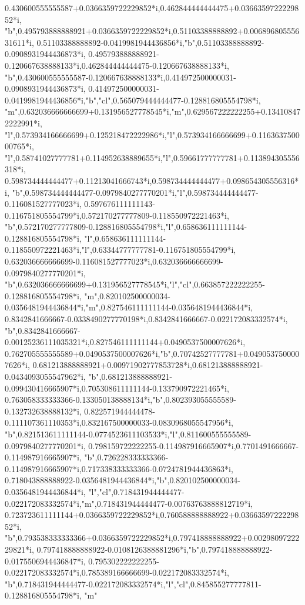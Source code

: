 \documentclass[border=5pt]{standalone}%
\begin{document}
\begin{luacode*}
{0.430600555555587+0.0366359722229852*i,0.462844444444475+0.0366359722229852*i,
"b",0.495793888888921+0.0366359722229852*i,0.51103388888892+0.00689680555631611*i,
0.51103388888892-0.0419981944436856*i,"b",0.51103388888892-0.0908931944436873*i,
0.495793888888921-0.120667638888133*i,0.462844444444475-0.120667638888133*i,
"b",0.430600555555587-0.120667638888133*i,0.414972500000031-0.0908931944436873*i,
0.414972500000031-0.0419981944436856*i,"b","cl",0.565079444444477-0.128816805554798*i,
"m",0.632036666666699+0.131956527778545*i,"m",0.629567222222255+0.134108472222991*i,
"l",0.573934166666699+0.125218472222986*i,"l",0.573934166666699+0.116363750000765*i,
"l",0.58741027777781+0.114952638889655*i,"l",0.59661777777781+0.113894305556318*i,
0.598734444444477+0.11213041666743*i,0.598734444444477+0.098654305556316*i,
"b",0.598734444444477-0.0979840277770201*i,"l",0.598734444444477-0.116081527777023*i,
0.597676111111143-0.116751805554799*i,0.572170277777809-0.118550972221463*i,
"b",0.572170277777809-0.128816805554798*i,"l",0.658636111111144-0.128816805554798*i,
"l",0.658636111111144-0.118550972221463*i,"l",0.63344777777781-0.116751805554799*i,
0.632036666666699-0.116081527777023*i,0.632036666666699-0.0979840277770201*i,
"b",0.632036666666699+0.131956527778545*i,"l","cl",0.663857222222255-0.128816805554798*i,
"m",0.820102500000034-0.0356481944436844*i,"m",0.827546111111144-0.0356481944436844*i,
0.8342841666667-0.0338490277770198*i,0.8342841666667-0.022172083332574*i,
"b",0.8342841666667-0.00125236111035321*i,0.827546111111144+0.0490537500007626*i,
0.762705555555589+0.0490537500007626*i,"b",0.70742527777781+0.0490537500007626*i,
0.681213888888921+0.00971902777853728*i,0.681213888888921-0.0434093055547962*i,
"b",0.681213888888921-0.099430416665907*i,0.705308611111144-0.133790972221465*i,
0.763058333333366-0.133050138888134*i,"b",0.802393055555589-0.132732638888132*i,
0.822571944444478-0.111107361110353*i,0.832167500000033-0.0830968055547956*i,
"b",0.821513611111144-0.0774523611103533*i,"l",0.811600555555589-0.0979840277770201*i,
0.798159722222255-0.114987916665907*i,0.7701491666667-0.114987916665907*i,
"b",0.726228333333366-0.114987916665907*i,0.717338333333366-0.0724781944436863*i,
0.718043888888922-0.0356481944436844*i,"b",0.820102500000034-0.0356481944436844*i,
"l","cl",0.718431944444477-0.022172083332574*i,"m",0.718431944444477-0.00763763888812719*i,
0.723723611111144+0.0366359722229852*i,0.760588888888922+0.0366359722229852*i,
"b",0.793538333333366+0.0366359722229852*i,0.797418888888922+0.0029809722229821*i,
0.797418888888922-0.0108126388881296*i,"b",0.797418888888922-0.0175506944436847*i,
0.795302222222255-0.022172083332574*i,0.785389166666699-0.022172083332574*i,
"b",0.718431944444477-0.022172083332574*i,"l","cl",0.845855277777811-0.128816805554798*i,
"m"}



\end{luacode*}
\end{document}
